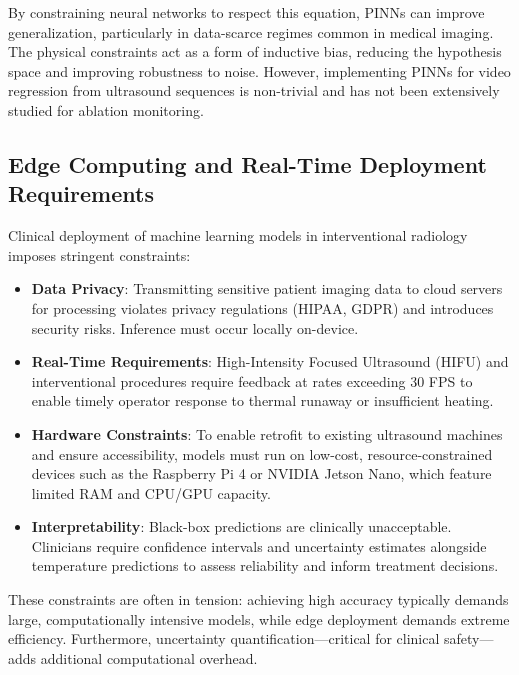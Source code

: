 By constraining neural networks to respect this equation, PINNs can improve generalization, particularly in data-scarce regimes common in medical imaging.
The physical constraints act as a form of inductive bias, reducing the hypothesis space and improving robustness to noise.
However, implementing PINNs for video regression from ultrasound sequences is non-trivial and has not been extensively studied for ablation monitoring.

\subsection{Edge Computing and Real-Time Deployment Requirements}

Clinical deployment of machine learning models in interventional radiology imposes stringent constraints:

\begin{itemize}
    \item \textbf{Data Privacy}: Transmitting sensitive patient imaging data to cloud servers for processing violates privacy regulations (HIPAA, GDPR) and introduces security risks.
    Inference must occur locally on-device.

    \item \textbf{Real-Time Requirements}: High-Intensity Focused Ultrasound (HIFU) and interventional procedures require feedback at rates exceeding 30 FPS to enable timely operator response to thermal runaway or insufficient heating.

    \item \textbf{Hardware Constraints}: To enable retrofit to existing ultrasound machines and ensure accessibility, models must run on low-cost, resource-constrained devices such as the Raspberry Pi 4 or NVIDIA Jetson Nano, which feature limited RAM and CPU/GPU capacity.

    \item \textbf{Interpretability}: Black-box predictions are clinically unacceptable. Clinicians require confidence intervals and uncertainty estimates alongside temperature predictions to assess reliability and inform treatment decisions.
\end{itemize}

These constraints are often in tension: achieving high accuracy typically demands large, computationally intensive models, while edge deployment demands extreme efficiency.
Furthermore, uncertainty quantification---critical for clinical safety---adds additional computational overhead.

